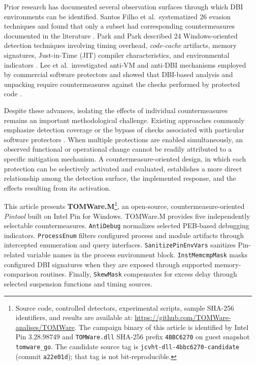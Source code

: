 \documentclass[pdflatex,sn-mathphys-num]{sn-jnl}
\theoremstyle{thmstyleone}
\theoremstyle{thmstyletwo}
\theoremstyle{thmstylethree}
\begin{document}
Prior research has documented several observation surfaces through which DBI environments can be identified. Santos Filho et al.\ systematized 26 evasion techniques and found that only a subset had corresponding countermeasures documented in the literature \cite{GiorgioC2022}. Park and Park described 24 Windows-oriented detection techniques involving timing overhead, \textit{code-cache} artifacts, memory signatures, Just-in-Time (JIT) compiler characteristics, and environmental indicators \cite{park2024detection}. Lee et al.\ investigated anti-VM and anti-DBI mechanisms employed by commercial software protectors and showed that DBI-based analysis and unpacking require countermeasures against the checks performed by protected code \cite{lee2021bypassing}.

Despite these advances, isolating the effects of individual countermeasures remains an important methodological challenge. Existing approaches commonly emphasize detection coverage or the bypass of checks associated with particular software protectors \cite{polino2017measuring,lee2021bypassing,park2019antidebug}. When multiple protections are enabled simultaneously, an observed functional or operational change cannot be readily attributed to a specific mitigation mechanism. A countermeasure-oriented design, in which each protection can be selectively activated and evaluated, establishes a more direct relationship among the detection surface, the implemented response, and the effects resulting from its activation.

This article presents \textbf{TOMWare.M}\footnote{Source code, controlled detectors, experimental scripts, sample SHA-256 identifiers, and results are available at: \url{https://github.com/TOMWare-analises/TOMWare}. The campaign binary of this article is identified by Intel Pin $3.28.98749$ and \texttt{TOMWare.dll} SHA-256 prefix \texttt{4BBC6270} on guest snapshot \texttt{tomware\_go}. The candidate source tag is \texttt{jcvht-dll-4bbc6270-candidate} (commit \texttt{a22e01d}); that tag is not bit-reproducible.}, an open-source, countermeasure-oriented \textit{Pintool} built on Intel Pin for Windows. TOMWare.M provides five independently selectable countermeasures. \texttt{AntiDebug} normalizes selected PEB-based debugging indicators. \texttt{ProcessEnum} filters configured process and module artifacts through intercepted enumeration and query interfaces. \texttt{SanitizePinEnvVars} sanitizes Pin-related variable names in the process environment block. \texttt{InstMemcmpMask} masks configured DBI signatures when they are exposed through supported memory-comparison routines. Finally, \texttt{SkewMask} compensates for excess delay through selected suspension functions and timing sources.
\end{document}
